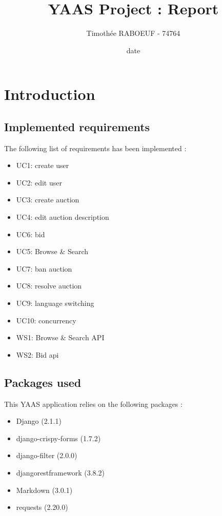 \documentclass[a4paper, 11pt]{report}
\title{YAAS Project : Report}
\author{Timothée RABOEUF - 74764}
\date{date}
\begin{document}
 
\maketitle
\tableofcontents
    
\chapter{Introduction}

    \section{Implemented requirements}

    The following list of requirements has been implemented : 
    \begin{itemize}
        \item UC1: create user
        \item UC2: edit user
        \item UC3: create auction
        \item UC4: edit auction description
        \item UC6: bid
        \item UC5: Browse \& Search
        \item UC7: ban auction
        \item UC8: resolve auction
        \item UC9: language switching
        \item UC10: concurrency
        \item WS1: Browse \& Search API
        \item WS2: Bid api

    \end{itemize}

    \section{Packages used}
    This YAAS application relies on the following packages :
    \begin{itemize}
        \item Django (2.1.1)
        \item django-crispy-forms (1.7.2)
        \item django-filter (2.0.0) 
        \item djangorestframework (3.8.2)
        \item Markdown (3.0.1)
        \item requests (2.20.0)
        
    \end{itemize}
\end{document}
